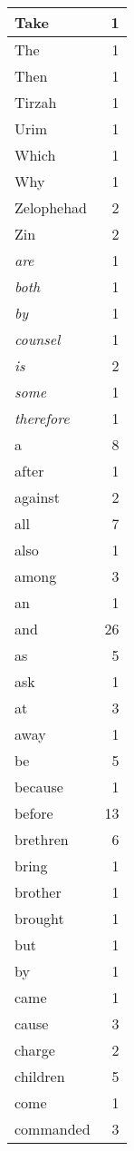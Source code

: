 \begin{center}
\begin{longtable}{l|r}
Take & 1\\ \hline 
The & 1\\ \hline 
Then & 1\\ \hline 
Tirzah & 1\\ \hline 
Urim & 1\\ \hline 
Which & 1\\ \hline 
Why & 1\\ \hline 
Zelophehad & 2\\ \hline 
Zin & 2\\ \hline 
\emph{are} & 1\\ \hline 
\emph{both} & 1\\ \hline 
\emph{by} & 1\\ \hline 
\emph{counsel} & 1\\ \hline 
\emph{is} & 2\\ \hline 
\emph{some} & 1\\ \hline 
\emph{therefore} & 1\\ \hline 
a & 8\\ \hline 
after & 1\\ \hline 
against & 2\\ \hline 
all & 7\\ \hline 
also & 1\\ \hline 
among & 3\\ \hline 
an & 1\\ \hline 
and & 26\\ \hline 
as & 5\\ \hline 
ask & 1\\ \hline 
at & 3\\ \hline 
away & 1\\ \hline 
be & 5\\ \hline 
because & 1\\ \hline 
before & 13\\ \hline 
brethren & 6\\ \hline 
bring & 1\\ \hline 
brother & 1\\ \hline 
brought & 1\\ \hline 
but & 1\\ \hline 
by & 1\\ \hline 
came & 1\\ \hline 
cause & 3\\ \hline 
charge & 2\\ \hline 
children & 5\\ \hline 
come & 1\\ \hline 
commanded & 3\\ \hline 

\end{longtable}
\end{center}
